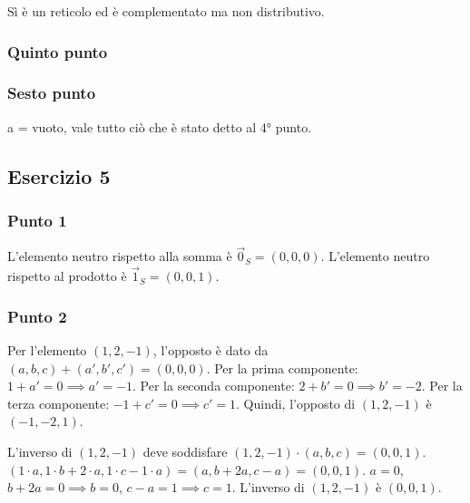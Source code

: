 Sì è un reticolo ed è complementato ma non distributivo.

\subsubsection*{Quinto punto}

\begin{center}
\end{center}

\subsubsection*{Sesto punto}

a = vuoto, vale tutto ciò che è stato detto al 4° punto.

\subsection*{Esercizio 5}

\subsubsection*{Punto 1}
L'elemento neutro rispetto alla somma è $\vec{0}_S = (0, 0, 0)$.
L'elemento neutro rispetto al prodotto è $\vec{1}_S = (0, 0, 1)$.

\subsubsection*{Punto 2}
Per l'elemento $(1, 2, -1)$, l'opposto è dato da $(a,b,c) + (a',b',c') = (0,0,0)$.
Per la prima componente: $1 + a' = 0 \implies a' = -1$.
Per la seconda componente: $2 + b' = 0 \implies b' = -2$.
Per la terza componente: $-1 + c' = 0 \implies c' = 1$.
Quindi, l'opposto di $(1, 2, -1)$ è $(-1, -2, 1)$.

L'inverso di $(1, 2, -1)$ deve soddisfare $(1, 2, -1) \cdot (a, b, c) = (0, 0, 1)$.
$(1 \cdot a, 1 \cdot b + 2 \cdot a, 1 \cdot c -1 \cdot a) = (a, b+2a, c-a) = (0, 0, 1)$.
$a=0$, $b+2a=0 \implies b=0$, $c-a=1 \implies c=1$.
L'inverso di $(1, 2, -1)$ è $(0, 0, 1)$.

